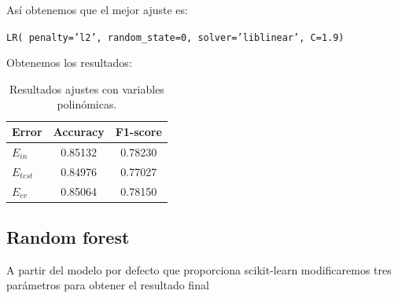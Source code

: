 \documentclass[11pt,a4paper]{article}
\begin{document}
Así obtenemos que el mejor ajuste es:

{\begin{center}
    \texttt{LR( penalty='l2', random\_state=0, solver='liblinear', C=1.9)}
  \end{center}}

Obtenemos los resultados:

\begin{table}[h]
\begin{center}
\begin{tabular}{|l|c|c|}
\hline
  Error & Accuracy & F1-score \\ \hline
  $E_{in}$ & 0.85132 & 0.78230 \\
  $E_{test}$ & 0.84976 & 0.77027  \\
  $E_{cv}$ &0.85064 & 0.78150  \\\hline
\end{tabular}
\label{tab:resultlin}
\caption{Resultados ajustes con variables polinómicas.}

\end{center}
\end{table}

\newpage
\subsection{Random forest}

A partir del modelo por defecto que proporciona scikit-learn modificaremos tres parámetros para obtener el resultado final
\end{document}
